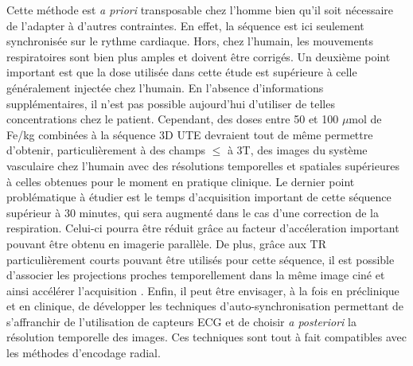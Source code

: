  
Cette méthode est \textit{a priori} transposable chez l'homme bien qu'il soit nécessaire de l'adapter à d'autres contraintes. En effet, la séquence est ici seulement synchronisée sur le rythme cardiaque. Hors, chez l’humain, les mouvements respiratoires sont bien plus amples et doivent être corrigés.
Un deuxième point important est que la dose utilisée dans cette étude est supérieure à celle généralement injectée chez l'humain. En l'absence d'informations supplémentaires, il n'est pas possible aujourd'hui d'utiliser de telles concentrations chez le patient. Cependant, des doses entre 50 et 100 $\mu$mol de Fe/kg combinées à la séquence 3D UTE devraient tout de même permettre d'obtenir, particulièrement à des champs $\leq$ à 3T, des images du système vasculaire chez l’humain avec des résolutions temporelles et spatiales supérieures à celles obtenues pour le moment en pratique clinique. Le dernier point problématique à étudier est le temps d’acquisition important de cette séquence supérieur à 30 minutes, qui sera augmenté dans le cas d’une correction de la respiration. Celui-ci pourra être réduit grâce au facteur d’accéleration important pouvant être obtenu en imagerie parallèle. De plus, grâce aux TR particulièrement courts pouvant être utilisés pour cette séquence, il est possible d’associer les projections proches temporellement dans la même image ciné et ainsi accélérer l’acquisition \cite{Trotier2015Time-resolved-T}.
Enfin, il peut être envisager, à la fois en préclinique et en clinique, de développer les techniques d’auto-synchronisation permettant de s’affranchir de l’utilisation de capteurs ECG et de choisir \textit{a posteriori} la résolution temporelle des images. Ces techniques sont tout à fait compatibles avec les méthodes d’encodage radial.

\cleardoublepage







